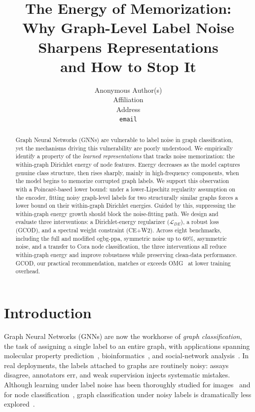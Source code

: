 \documentclass{article}
\title{The Energy of Memorization:\\Why Graph-Level Label Noise Sharpens Representations\\and How to Stop It}
\author{%
  Anonymous Author(s)\\
  Affiliation\\
  Address\\
  \texttt{email}\\
}
\theoremstyle{definition}
\newcommand{\method}{GCOD}
\begin{document}
\maketitle

\begin{abstract}
Graph Neural Networks (GNNs) are vulnerable to label noise in graph classification, yet the mechanisms driving this vulnerability are poorly understood. We empirically identify a property of the \emph{learned representations} that tracks noise memorization: the within-graph Dirichlet energy of node features. Energy decreases as the model captures genuine class structure, then rises sharply, mainly in high-frequency components, when the model begins to memorize corrupted graph labels. We support this observation with a Poincar\'e-based lower bound: under a lower-Lipschitz regularity assumption on the encoder, fitting noisy graph-level labels for two structurally similar graphs forces a lower bound on their within-graph Dirichlet energies. Guided by this, suppressing the within-graph energy growth should block the noise-fitting path. We design and evaluate three interventions: a Dirichlet-energy regularizer ($\mathcal{L}_{DE}$), a robust loss (\method{}), and a spectral weight constraint (CE+W2). Across eight benchmarks, including the full and modified ogbg-ppa, symmetric noise up to $60\%$, asymmetric noise, and a transfer to Cora node classification, the three interventions all reduce within-graph energy and improve robustness while preserving clean-data performance. \method{}, our practical recommendation, matches or exceeds OMG~\citep{omg7} at lower training overhead.
\end{abstract}

\section{Introduction}
\label{sec:intro}

Graph Neural Networks (GNNs) are now the workhorse of \emph{graph classification}, the task of assigning a single label to an entire graph, with applications spanning molecular property prediction~\citep{NCI}, bioinformatics~\citep{proteins}, and social-network analysis~\citep{COLLAB}. In real deployments, the labels attached to graphs are routinely noisy: assays disagree, annotators err, and weak supervision injects systematic mistakes. Although learning under label noise has been thoroughly studied for images~\citep{algan2021image} and for node classification~\citep{nrgnn11,contrastivelearning5}, graph classification under noisy labels is dramatically less explored~\citep{graphC1, omg7}.
\end{document}
